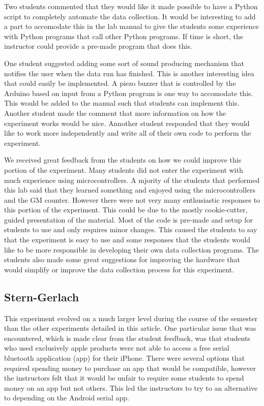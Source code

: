 Two students commented that they would like it made possible to have a Python script to completely automate the data collection.
It would be interesting to add a part to accomodate this in the lab manual to give the students some experience with Python programs that call other Python programs.
If time is short, the instructor could provide a pre-made program that does this.

One student suggested adding some sort of sound producing mechanism that notifies the user when the data run has finished.
This is another interesting idea that could easily be implemented.
A piezo buzzer that is controlled by the Arduino based on input from a Python program is one way to accomodate this.
This would be added to the manual such that students can implement this.
Another student made the comment that more information on how the experiment works would be nice.
Annother student responded that they would like to work more independently and write all of their own code to perform the experiment.


We received great feedback from the students on how we could improve this portion of the experiment.
Many students did not enter the experiment with much experience using microcontrollers.
A mjority of the students that performed this lab said that they learned something and enjoyed using the microcontrollers and the GM counter.
However there were not very many enthusiastic responses to this portion of the experiment.
This could be due to the mostly cookie-cutter, guided presentation of the material.
Most of the code is pre-made and setup for students to use and only requires minor changes.
This caused the students to say that the experiment is easy to use and some responses that the students would like to be more responsible in developing their own data collection programs.
The students also made some great suggestions for improving the hardware that would simplify or improve the data collection process for this experiment.

\subsection{Stern-Gerlach}
This experiment evolved on a much larger level during the course of the semester than the other experiments detailed in this article.
One particular issue that was encountered, which is made clear from the student feedback, was that students who used exclusively apple products were not able to access a free serial bluetooth application (app) for their iPhone.
There were several options that required spending money to purchase an app that would be compatible, however the instructors felt that it would be unfair to require some students to spend money on an app but not others.
This led the instructors to try to an alternative to depending on the Android serial app.

